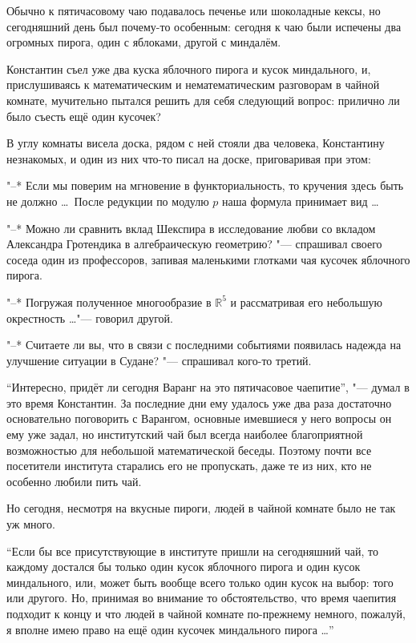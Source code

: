 \medskip
Обычно к пятичасовому чаю подавалось печенье или шоколадные кексы, но
сегодняшний день был почему-то особенным: сегодня к чаю были испечены два
огромных пирога, один с яблоками, другой с миндалём.

Константин съел уже два куска яблочного пирога и кусок миндального, и,
прислушиваясь к математическим и нематематическим разговорам в чайной комнате,
мучительно пытался решить для себя следующий вопрос: прилично ли было съесть ещё
один кусочек?

В углу комнаты висела доска, рядом с ней стояли два человека, Константину
незнакомых, и один из них что-то писал на доске, приговаривая при этом:

"--* Если мы поверим на мгновение в функториальность, то кручения здесь быть не
должно \ldots\
После редукции по модулю $p$ наша формула принимает вид \ldots

"--* Можно ли сравнить вклад Шекспира в исследование любви со вкладом Александра
Гротендика в алгебраическую геометрию? "--- спрашивал своего соседа один из
профессоров, запивая маленькими глотками чая кусочек яблочного пирога.

"--* Погружая полученное многообразие в $\mathbb{R}^5$ и рассматривая его
небольшую окрестность \ldots "--- говорил другой.

"--* Считаете ли вы, что в связи с последними событиями появилась надежда на
улучшение ситуации в Судане? "--- спрашивал кого-то третий.

\enquote{Интересно, придёт ли сегодня Варанг на это пятичасовое чаепитие}, "---
думал в это время Константин.
За последние дни ему удалось уже два раза достаточно основательно поговорить с
Варангом, основные имевшиеся у него вопросы он ему уже задал, но институтский
чай был всегда наиболее благоприятной возможностью для небольшой математической
беседы.
Поэтому почти все посетители института старались его не пропускать, даже те из
них, кто не особенно любили пить чай.

Но сегодня, несмотря на вкусные пироги, людей в чайной комнате было не так уж
много.

\enquote{Если бы все присутствующие в институте пришли на сегодняшний чай, то
каждому достался бы только один кусок яблочного пирога и один кусок миндального,
или, может быть вообще всего только один кусок на выбор: того или другого.
Но, принимая во внимание то обстоятельство, что время чаепития подходит к концу
и что людей в чайной комнате по-прежнему немного, пожалуй, я вполне имею право
на ещё один кусочек миндального пирога \ldots}

